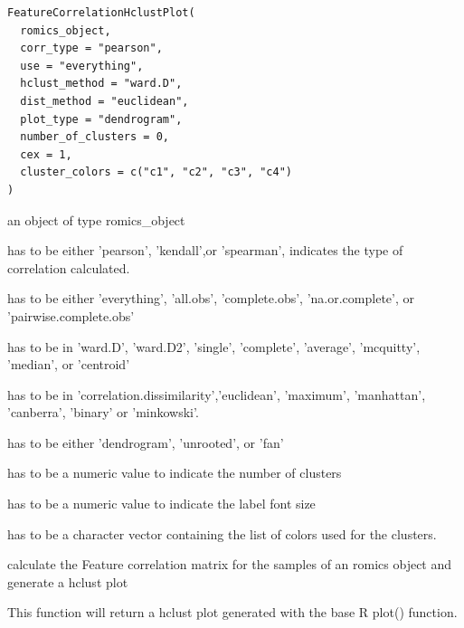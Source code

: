 \documentclass[a4paper]{book}
\begin{document}
%
\begin{Usage}
\begin{verbatim}
FeatureCorrelationHclustPlot(
  romics_object,
  corr_type = "pearson",
  use = "everything",
  hclust_method = "ward.D",
  dist_method = "euclidean",
  plot_type = "dendrogram",
  number_of_clusters = 0,
  cex = 1,
  cluster_colors = c("c1", "c2", "c3", "c4")
)
\end{verbatim}
\end{Usage}
%
\begin{Arguments}
\begin{ldescription}
\item[\code{romics\_object}] an object of type romics\_object

\item[\code{corr\_type}] has to be either 'pearson', 'kendall',or 'spearman', indicates the type of correlation calculated.

\item[\code{use}] has to be either 'everything', 'all.obs', 'complete.obs', 'na.or.complete', or 'pairwise.complete.obs'

\item[\code{hclust\_method}] has to be in 'ward.D', 'ward.D2', 'single', 'complete', 'average', 'mcquitty', 'median', or 'centroid'

\item[\code{dist\_method}] has to be in 'correlation.dissimilarity','euclidean', 'maximum', 'manhattan', 'canberra', 'binary' or 'minkowski'.

\item[\code{plot\_type}] has to be either 'dendrogram', 'unrooted', or 'fan'

\item[\code{number\_of\_clusters}] has to be a numeric value to indicate the number of clusters

\item[\code{cex}] has to be a numeric value to indicate the label font size

\item[\code{cluster\_colors}] has to be a character vector containing the list of colors used for the clusters.
\end{ldescription}
\end{Arguments}
%
\begin{Details}
calculate the Feature correlation matrix for the samples of an romics object and generate a hclust plot
\end{Details}
%
\begin{Value}
This function will return a hclust plot generated with the base R plot() function.
\end{Value}
\end{document}
